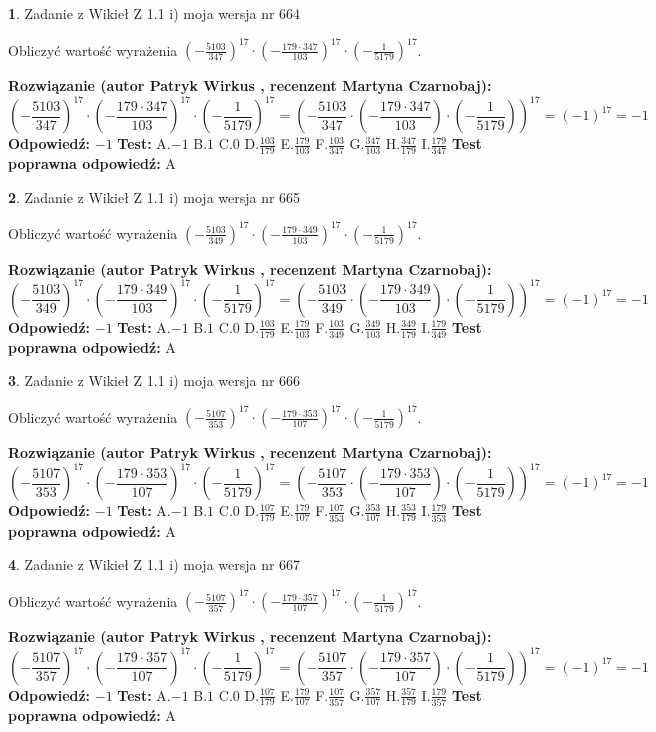 \documentclass[12pt, a4paper]{article}
\theoremstyle{definition} %
\newtheorem{zad}{}
\newcommand{\zadStart}[1]{\begin{zad}#1\newline}
\newcommand{\zadStop}{\end{zad}}
\newcommand{\rozwStart}[2]{\noindent \textbf{Rozwiązanie (autor #1 , recenzent #2): }\newline}
\newcommand{\rozwStop}{\newline}
\newcommand{\odpStart}{\noindent \textbf{Odpowiedź:}\newline}
\newcommand{\odpStop}{\newline}
\newcommand{\testStart}{\noindent \textbf{Test:}\newline}
\newcommand{\testStop}{\newline}
\newcommand{\kluczStart}{\noindent \textbf{Test poprawna odpowiedź:}\newline}
\newcommand{\kluczStop}{\newline}
\begin{document}
\zadStart{Zadanie z Wikieł Z 1.1 i) moja wersja nr 664}

Obliczyć wartość wyrażenia $(-\frac{5103}{347})^{17} \cdot (-\frac{179 \cdot 347}{103})^{17} \cdot (-\frac{1}{5179})^{17}$.
\zadStop
\rozwStart{Patryk Wirkus}{Martyna Czarnobaj}
$$(-\frac{5103}{347})^{17} \cdot (-\frac{179 \cdot 347}{103})^{17} \cdot (-\frac{1}{5179})^{17} = (-\frac{5103}{347} \cdot (-\frac{179 \cdot 347}{103}) \cdot (-\frac{1}{5179}))^{17} = (-1)^{17} = -1$$
\rozwStop
\odpStart
$-1$
\odpStop
\testStart
A.$-1$ B.$1$ C.$0$ D.$\frac{103}{179}$ E.$\frac{179}{103}$
F.$\frac{103}{347}$ G.$\frac{347}{103}$
H.$\frac{347}{179}$
I.$\frac{179}{347}$
\testStop
\kluczStart
A
\kluczStop



\zadStart{Zadanie z Wikieł Z 1.1 i) moja wersja nr 665}

Obliczyć wartość wyrażenia $(-\frac{5103}{349})^{17} \cdot (-\frac{179 \cdot 349}{103})^{17} \cdot (-\frac{1}{5179})^{17}$.
\zadStop
\rozwStart{Patryk Wirkus}{Martyna Czarnobaj}
$$(-\frac{5103}{349})^{17} \cdot (-\frac{179 \cdot 349}{103})^{17} \cdot (-\frac{1}{5179})^{17} = (-\frac{5103}{349} \cdot (-\frac{179 \cdot 349}{103}) \cdot (-\frac{1}{5179}))^{17} = (-1)^{17} = -1$$
\rozwStop
\odpStart
$-1$
\odpStop
\testStart
A.$-1$ B.$1$ C.$0$ D.$\frac{103}{179}$ E.$\frac{179}{103}$
F.$\frac{103}{349}$ G.$\frac{349}{103}$
H.$\frac{349}{179}$
I.$\frac{179}{349}$
\testStop
\kluczStart
A
\kluczStop



\zadStart{Zadanie z Wikieł Z 1.1 i) moja wersja nr 666}

Obliczyć wartość wyrażenia $(-\frac{5107}{353})^{17} \cdot (-\frac{179 \cdot 353}{107})^{17} \cdot (-\frac{1}{5179})^{17}$.
\zadStop
\rozwStart{Patryk Wirkus}{Martyna Czarnobaj}
$$(-\frac{5107}{353})^{17} \cdot (-\frac{179 \cdot 353}{107})^{17} \cdot (-\frac{1}{5179})^{17} = (-\frac{5107}{353} \cdot (-\frac{179 \cdot 353}{107}) \cdot (-\frac{1}{5179}))^{17} = (-1)^{17} = -1$$
\rozwStop
\odpStart
$-1$
\odpStop
\testStart
A.$-1$ B.$1$ C.$0$ D.$\frac{107}{179}$ E.$\frac{179}{107}$
F.$\frac{107}{353}$ G.$\frac{353}{107}$
H.$\frac{353}{179}$
I.$\frac{179}{353}$
\testStop
\kluczStart
A
\kluczStop



\zadStart{Zadanie z Wikieł Z 1.1 i) moja wersja nr 667}

Obliczyć wartość wyrażenia $(-\frac{5107}{357})^{17} \cdot (-\frac{179 \cdot 357}{107})^{17} \cdot (-\frac{1}{5179})^{17}$.
\zadStop
\rozwStart{Patryk Wirkus}{Martyna Czarnobaj}
$$(-\frac{5107}{357})^{17} \cdot (-\frac{179 \cdot 357}{107})^{17} \cdot (-\frac{1}{5179})^{17} = (-\frac{5107}{357} \cdot (-\frac{179 \cdot 357}{107}) \cdot (-\frac{1}{5179}))^{17} = (-1)^{17} = -1$$
\rozwStop
\odpStart
$-1$
\odpStop
\testStart
A.$-1$ B.$1$ C.$0$ D.$\frac{107}{179}$ E.$\frac{179}{107}$
F.$\frac{107}{357}$ G.$\frac{357}{107}$
H.$\frac{357}{179}$
I.$\frac{179}{357}$
\testStop
\kluczStart
A
\kluczStop
\end{document}
